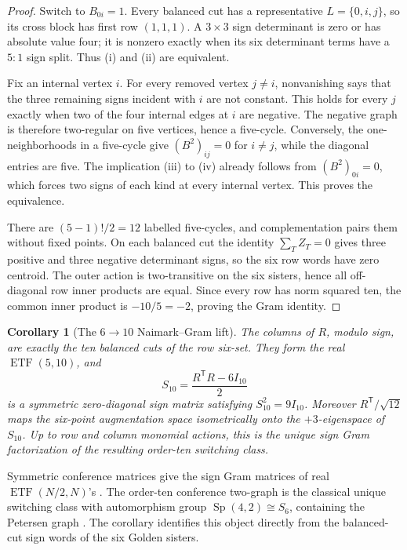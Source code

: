 \documentclass[11pt]{article}
\newtheorem{corollary}[theorem]{Corollary}
\theoremstyle{definition}
\theoremstyle{remark}
\begin{document}
\begin{proof}
Switch to \(B_{0i}=1\).  Every balanced cut has a representative
\(L=\{0,i,j\}\), so its cross block has first row \((1,1,1)\).  A
\(3\times3\) sign determinant is zero or has absolute value four; it is
nonzero exactly when its six determinant terms have a \(5{:}1\) sign
split.  Thus (i) and (ii) are equivalent.

Fix an internal vertex \(i\).  For every removed vertex \(j\ne i\),
nonvanishing says that the three remaining signs incident with \(i\) are
not constant.  This holds for every \(j\) exactly when two of the four
internal edges at \(i\) are negative.  The negative graph is therefore
two-regular on five vertices, hence a five-cycle.  Conversely, the
one-neighborhoods in a five-cycle give
\((B^2)_{ij}=0\) for \(i\ne j\), while the diagonal entries are five.
The implication (iii) to (iv) already follows from
\((B^2)_{0i}=0\), which forces two signs of each kind at every internal
vertex.  This proves the equivalence.

There are \((5-1)!/2=12\) labelled five-cycles, and complementation pairs
them without fixed points.  On each balanced cut the identity
\(\sum_TZ_T=0\) gives three positive and three negative determinant signs,
so the six row words have zero centroid.  The outer action is
two-transitive on the six sisters, hence all off-diagonal row inner
products are equal.  Since every row has norm squared ten, the common
inner product is \(-10/5=-2\), proving the Gram identity.
\end{proof}

\begin{corollary}[The \(6\to10\) Naimark--Gram lift]
\label{cor:naimark}
The columns of \(R\), modulo sign, are exactly the ten balanced cuts of
the row six-set.  They form the real \(\operatorname{ETF}(5,10)\), and
\[
 S_{10}=\frac{R^{\mathsf T}R-6I_{10}}2
\]
is a symmetric zero-diagonal sign matrix satisfying \(S_{10}^2=9I_{10}\).
Moreover \(R^{\mathsf T}/\sqrt{12}\) maps the six-point augmentation
space isometrically onto the \(+3\)-eigenspace of \(S_{10}\).  Up to row
and column monomial actions, this is the unique sign Gram factorization of
the resulting order-ten switching class.
\end{corollary}

Symmetric conference matrices give the sign Gram matrices of real
\(\operatorname{ETF}(N/2,N)\)'s \cite[Section~2]{FickusMixon}.  The
order-ten conference two-graph is the classical unique switching class
with automorphism group \(\operatorname{Sp}(4,2)\cong S_6\), containing
the Petersen graph \cite[Chapters~5--6]{BMS}.  The corollary identifies
this object directly from the balanced-cut sign words of the six Golden
sisters.
\end{document}

